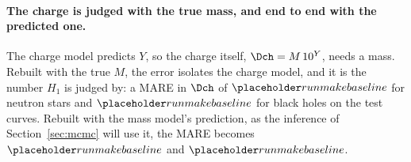 \paragraph{The charge is judged with the true mass, and end to end with the predicted one.}
The charge model predicts $Y$, so the charge itself, $\Dch = M\,10^{Y}$, needs a mass. Rebuilt with the true $M$, the error isolates the charge model, and it is the number $H_1$ is judged by: a MARE in $\Dch$ of $\baseNsChargeMareTrueM$ for neutron stars and $\baseBhChargeMareTrueM$ for black holes on the test curves. Rebuilt with the mass model's prediction, as the inference of Section~\ref{sec:mcmc} will use it, the MARE becomes $\baseNsChargeMarePredM$ and $\baseBhChargeMarePredM$.

\FloatBarrier
